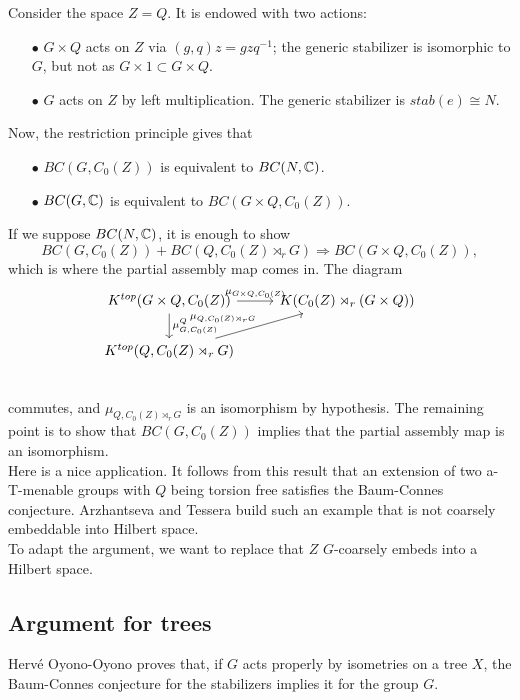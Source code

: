 Consider the space $Z = Q$. It is endowed with two actions:
\begin{itemize}
\item[$\bullet$] $G\times Q$ acts on $Z$ via $(g,q)z = gzq^{-1}$; the generic stabilizer is isomorphic to $G$, but not as $G\times 1 \subset G\times Q$.
\item[$\bullet$] $G$ acts on $Z$ by left multiplication. The generic stabilizer is $stab(e) \cong N$.
\end{itemize}

Now, the restriction principle gives that 
\begin{itemize}
\item[$\bullet$] $BC(G,C_0(Z))$ is equivalent to $BC(N,\mathbb C)$.
\item[$\bullet$] $BC(G,\mathbb C)$ is equivalent to $BC(G\times Q,C_0(Z))$.
\end{itemize}

If we suppose $BC(N,\mathbb C)$, it is enough to show
\[BC(G,C_0(Z)) + BC(Q,C_0(Z)\rtimes_r G) \Rightarrow BC(G\times Q,C_0(Z)),\]
which is where the partial assembly map comes in. The diagram 
\[\begin{tikzcd}
K^{top}(G\times Q , C_0(Z)) \arrow{r}{\mu_{G\times Q, C_0(Z)}} \arrow{d}{\mu^{Q}_{G,C_0(Z)}}& K(C_0(Z)\rtimes_r (G\times Q)) \\
K^{top}(Q , C_0(Z)\rtimes_r G) \arrow{ru}{\mu_{Q,C_0(Z)\rtimes_r G}}& \\
\end{tikzcd}\]
commutes, and $\mu_{Q,C_0(Z)\rtimes_r G}$ is an isomorphism by hypothesis. The remaining point is to show that $BC(G,C_0(Z))$ implies that the partial assembly map is an isomorphism.\\

Here is a nice application. It follows from this result that an extension of two a-T-menable groups with $Q$ being torsion free satisfies the Baum-Connes conjecture. Arzhantseva and Tessera build such an example that is not coarsely embeddable into Hilbert space.\\

To adapt the argument, we want to replace that $Z$ $G$-coarsely embeds into a Hilbert space.

\subsection{Argument for trees}

Herv\'e Oyono-Oyono proves that, if $G$ acts properly by isometries on a tree $X$, the Baum-Connes conjecture for the stabilizers implies it for the group $G$.\\


